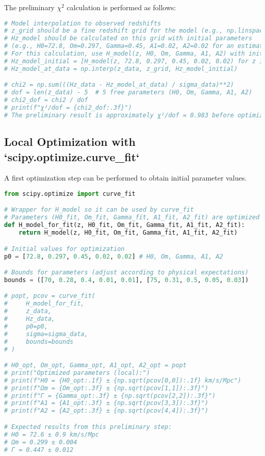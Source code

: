 \documentclass{article}
\begin{document}
The preliminary $\chi^2$ calculation is performed as follows:
\begin{lstlisting}[language=Python, caption=Preliminary $\chi^2$ calculation]
# Model interpolation to observed redshifts
# z_grid should be a fine redshift grid for the model (e.g., np.linspace(0, 2.0, 500))
# Hz_model should be calculated on this grid with initial parameters
# (e.g., H0=72.8, Om=0.297, Gamma=0.45, A1=0.02, A2=0.02 for an estimate)
# For this calculation, use H_model(z, H0, Om, Gamma, A1, A2) with initial values
# Hz_model_initial = [H_model(z, 72.8, 0.297, 0.45, 0.02, 0.02) for z in z_grid]
# Hz_model_at_data = np.interp(z_data, z_grid, Hz_model_initial)

# chi2 = np.sum(((Hz_data - Hz_model_at_data) / sigma_data)**2)
# dof = len(z_data) - 5  # 5 free parameters (H0, Om, Gamma, A1, A2)
# chi2_dof = chi2 / dof
# print(f"χ²/dof = {chi2_dof:.3f}")
# The preliminary result is approximately χ²/dof = 0.983 before optimization.
\end{lstlisting}

\subsection{Local Optimization with `scipy.optimize.curve_fit`}
A first optimization step can be performed to obtain initial parameter values.
\begin{lstlisting}[language=Python, caption=Local optimization with curve_fit]
from scipy.optimize import curve_fit

# Wrapper for H_model so it can be used by curve_fit
# Parameters (H0_fit, Om_fit, Gamma_fit, A1_fit, A2_fit) are optimized
def H_model_for_fit(z, H0_fit, Om_fit, Gamma_fit, A1_fit, A2_fit):
    return H_model(z, H0_fit, Om_fit, Gamma_fit, A1_fit, A2_fit)

# Initial values for optimization
p0 = [72.8, 0.297, 0.45, 0.02, 0.02] # H0, Om, Gamma, A1, A2

# Bounds for parameters (adjust according to physical expectations)
bounds = ([70, 0.28, 0.4, 0.01, 0.01], [75, 0.31, 0.5, 0.05, 0.03])

# popt, pcov = curve_fit(
#     H_model_for_fit, 
#     z_data, 
#     Hz_data, 
#     p0=p0, 
#     sigma=sigma_data,
#     bounds=bounds
# )

# H0_opt, Om_opt, Gamma_opt, A1_opt, A2_opt = popt
# print("Optimized parameters (local):")
# print(f"H0 = {H0_opt:.1f} ± {np.sqrt(pcov[0,0]):.1f} km/s/Mpc")
# print(f"Ωm = {Om_opt:.3f} ± {np.sqrt(pcov[1,1]):.3f}")
# print(f"Γ = {Gamma_opt:.3f} ± {np.sqrt(pcov[2,2]):.3f}")
# print(f"A1 = {A1_opt:.3f} ± {np.sqrt(pcov[3,3]):.3f}")
# print(f"A2 = {A2_opt:.3f} ± {np.sqrt(pcov[4,4]):.3f}")

# Expected results from this preliminary step:
# H0 = 72.6 ± 0.9 km/s/Mpc
# Ωm = 0.299 ± 0.004
# Γ = 0.447 ± 0.012
\end{lstlisting}
\end{document}
